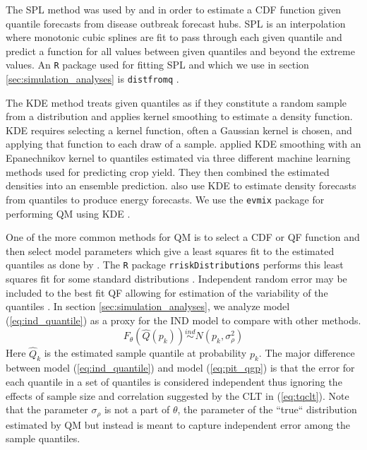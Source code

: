 The SPL method was used by \cite{gerding2023evaluating} and 
\cite{shandross2024hubensembles} in order to estimate a CDF function given 
quantile forecasts from disease outbreak forecast hubs. SPL is an interpolation 
where monotonic cubic splines are fit to pass through each given quantile and 
predict a function for all values between given quantiles and beyond the 
extreme values. An \texttt{R} package used for fitting SPL and which we use in 
section \ref{sec:simulation_analyses} is \texttt{distfromq} 
\cite[]{ray2024quantmatch}.

The KDE method treats given quantiles as if they constitute a random sample 
from a distribution and applies kernel smoothing to estimate a density 
function. KDE requires selecting a kernel function, often a Gaussian kernel is 
chosen, and applying that function to each draw of a sample. 
\cite{gyamerah2020probabilistic} applied KDE smoothing with an Epanechnikov 
kernel to quantiles estimated via three different machine learning methods 
used for predicting crop yield. They then combined the estimated densities 
into an ensemble prediction. \cite{he2016short} also use KDE to estimate 
density forecasts from quantiles to produce energy forecasts. We use the 
\texttt{evmix} package for performing QM using KDE \cite[]{yang2018kde}.

One of the more common methods for QM is to select a CDF or QF function and 
then select model parameters which give a least squares fit to the estimated 
quantiles as done by \cite{li2019combining}. 
The \texttt{R} package \texttt{rriskDistributions} performs this least squares 
fit for some standard distributions \cite[]{belgorodski2017quantilemse}. 
Independent random error may be included to the best fit QF allowing for 
estimation of the variability of the quantiles \cite[]{nirwan2020bayesian}. 
In section \ref{sec:simulation_analyses}, we analyze model 
(\ref{eq:ind_quantile}) as a proxy for the IND model to compare with 
other methods. 
\begin{equation}
    \label{eq:ind_quantile}
    F_{\theta}(\hat{Q}(p_k)) \overset{ind}{\sim} N(p_k, \sigma_{\rho}^2)
\end{equation}
Here $\hat{Q}_k$ is the estimated sample quantile at probability $p_k$. 
The major difference between model (\ref{eq:ind_quantile}) and model 
(\ref{eq:pit_qgp}) is that the error for each quantile in a set of quantiles is 
considered independent thus ignoring the effects of sample size and correlation 
suggested by the CLT in (\ref{eq:tqclt}). Note that the parameter 
$\sigma_{\rho}$ is not a part of $\theta$, the parameter of the ``true`` 
distribution estimated by QM but instead is meant to capture independent 
error among the sample quantiles.





